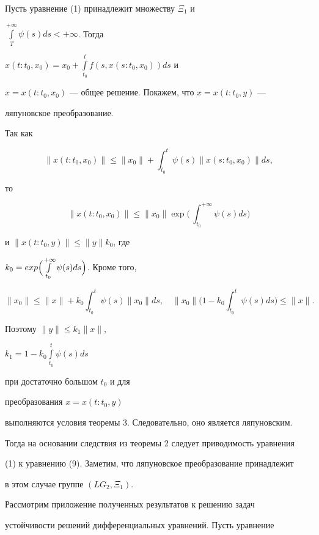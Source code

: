  


Пусть уравнение (1) принадлежит множеству $\Xi_1$ и 


$\int\limits^{+\infty}_T\psi(s)ds<+\infty$. Тогда 


$x(t:t_0,x_0)=x_0+\int\limits^t_{t_0}f(s,x(s:t_0,x_0))ds$ и 


$x=x(t:t_0,x_0)$ --- общее решение. Покажем, что $x=x(t:t_0,y)$ --- 


ляпуновское преобразование. 


Так как 


$$ 


\|x(t:t_0,x_0)\|\le\|x_0\|+\int^t_{t_0} 


\psi(s)\|x(s:t_0,x_0)\|ds, 


$$ 


то 


$$ 


\|x(t:t_0,x_0)\|\le \|x_0\|\exp\biggl(\,\int^{+\infty}_{t_0} 


\psi(s)ds\biggr) 


$$ 


и $\|x(t:t_0,y)\|\le\|y\|k_0$, где 


$k_0=exp\Bigl(\int\limits^{+\infty}_{t_0}\psi(s)ds\Bigr)$. Кроме того, 


$$ 


\|x_0\|\le \|x\|+k_0\int^t_{t_0}\psi(s)\|x_0\|ds,\quad 


\|x_0\|\biggl(1-k_0\int^t_{t_0}\psi(s)ds \biggr)\le\|x\|. 


$$ 


Поэтому $\|y\|\le k_1\|x\|$, 


$k_1=1-k_0\int\limits^t_{t_0}\psi(s)ds$ 


при достаточно большом $t_0$ и для 


преобразования $x=x(t:t_0,y)$ 


выполняются условия теоремы 3. Следовательно, оно является ляпуновским. 


Тогда на основании следствия из теоремы 2 следует приводимость уравнения 


(1) к уравнению (9). Заметим, что ляпуновское преобразование принадлежит 


в этом случае группе $(LG_2,\Xi_1)$. 


 


Рассмотрим приложение полученных результатов к решению задач 


устойчивости решений дифференциальных уравнений. Пусть уравнение 


